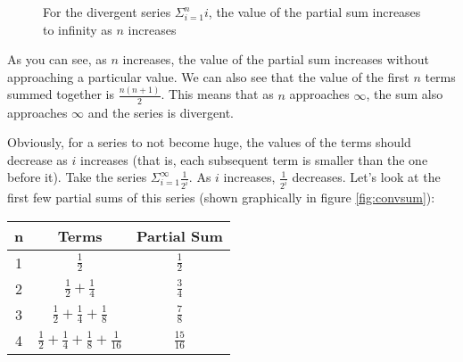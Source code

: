 \begin{figure}[htbp]
\centering
    \caption{For the divergent series $\Sigma_{i=1}^n i$, the value of the 
    partial sum increases to infinity as $n$ increases}
    \label{fig:divsum}
\end{figure}

As you can see, as $n$ increases, the value of the partial sum 
increases without approaching a particular value. We can also see 
that the value of the first $n$ terms summed together is 
$\frac{n(n+1)}{2}$. This means that as $n$ approaches $\infty$, the 
sum also approaches $\infty$ and the series is divergent. 

Obviously, for a series to not become huge, the values of the terms 
should decrease as $i$ increases (that is, each subsequent term is 
smaller than the one before it). Take the series $\Sigma_{i=1}^\infty 
\frac{1}{2^i}$. As $i$ increases, $\frac{1}{2^i}$ decreases. Let's 
look at the first few partial sums of this series (shown graphically 
in figure \ref{fig:convsum}):
\begin{center}
\begin{tabular}{|c|c|c|}\hline
n & Terms & Partial Sum\\
\hline
1 & $\frac{1}{2}$ & $\frac{1}{2}$\\
\hline
2 & $\frac{1}{2} + \frac{1}{4}$ & $\frac{3}{4}$\\
\hline
3 & $\frac{1}{2} + \frac{1}{4} + \frac{1}{8}$ & $\frac{7}{8}$\\
\hline
4 & $\frac{1}{2} + \frac{1}{4} + \frac{1}{8} + \frac{1}{16}$ & 
$\frac{15}{16}$\\
\hline
\end{tabular}
\end{center}

